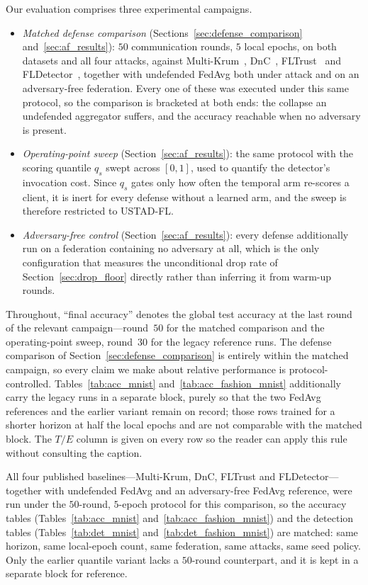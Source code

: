 \documentclass[journal]{IEEEtran}
\begin{document}
Our evaluation comprises three experimental campaigns.
\begin{itemize}
    \item \emph{Matched defense comparison} (Sections~\ref{sec:defense_comparison} and~\ref{sec:af_results}): $50$ communication rounds, $5$ local epochs, on both datasets and all four attacks, against Multi-Krum~\cite{blanchard2017machine}, DnC~\cite{shejwalkar2021manipulating}, FLTrust~\cite{cao2020fltrust} and FLDetector~\cite{zhang2022fldetector}, together with undefended FedAvg both under attack and on an adversary-free federation. Every one of these was executed under this same protocol, so the comparison is bracketed at both ends: the collapse an undefended aggregator suffers, and the accuracy reachable when no adversary is present.
    \item \emph{Operating-point sweep} (Section~\ref{sec:af_results}): the same protocol with the scoring quantile $q_s$ swept across $[0,1]$, used to quantify the detector's invocation cost. Since $q_s$ gates only how often the temporal arm re-scores a client, it is inert for every defense without a learned arm, and the sweep is therefore restricted to USTAD-FL.
    \item \emph{Adversary-free control} (Section~\ref{sec:af_results}): every defense additionally run on a federation containing no adversary at all, which is the only configuration that measures the unconditional drop rate of Section~\ref{sec:drop_floor} directly rather than inferring it from warm-up rounds.
\end{itemize}

Throughout, ``final accuracy'' denotes the global test accuracy at the last round of the relevant campaign---round~$50$ for the matched comparison and the operating-point sweep, round~$30$ for the legacy reference runs. The defense comparison of Section~\ref{sec:defense_comparison} is entirely within the matched campaign, so every claim we make about relative performance is protocol-controlled. Tables~\ref{tab:acc_mnist} and~\ref{tab:acc_fashion_mnist} additionally carry the legacy runs in a separate block, purely so that the two FedAvg references and the earlier variant remain on record; those rows trained for a shorter horizon at half the local epochs and are not comparable with the matched block. The $T/E$ column is given on every row so the reader can apply this rule without consulting the caption.

All four published baselines---Multi-Krum, DnC, FLTrust and FLDetector---together with undefended FedAvg and an adversary-free FedAvg reference, were run under the $50$-round, $5$-epoch protocol for this comparison, so the accuracy tables (Tables~\ref{tab:acc_mnist} and~\ref{tab:acc_fashion_mnist}) and the detection tables (Tables~\ref{tab:det_mnist} and~\ref{tab:det_fashion_mnist}) are matched: same horizon, same local-epoch count, same federation, same attacks, same seed policy. Only the earlier quantile variant lacks a $50$-round counterpart, and it is kept in a separate block for reference.
\end{document}
